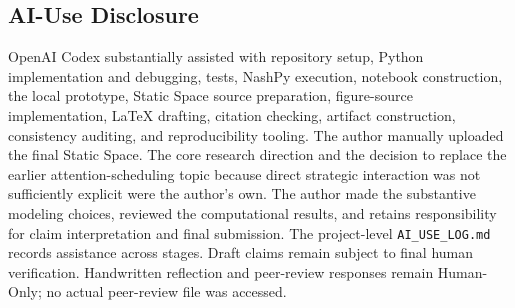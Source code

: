 \subsection{AI-Use Disclosure}
\label{app:ai}
OpenAI Codex substantially assisted with repository setup, Python implementation and debugging, tests, NashPy execution, notebook construction, the local prototype, Static Space source preparation, figure-source implementation, LaTeX drafting, citation checking, artifact construction, consistency auditing, and reproducibility tooling. The author manually uploaded the final Static Space. The core research direction and the decision to replace the earlier attention-scheduling topic because direct strategic interaction was not sufficiently explicit were the author's own. The author made the substantive modeling choices, reviewed the computational results, and retains responsibility for claim interpretation and final submission. The project-level \texttt{AI\_USE\_LOG.md} records assistance across stages. Draft claims remain subject to final human verification. Handwritten reflection and peer-review responses remain Human-Only; no actual peer-review file was accessed.
